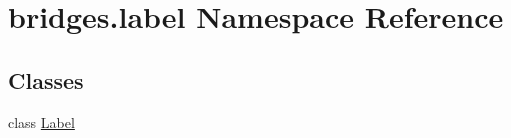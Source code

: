 \hypertarget{namespacebridges_1_1label}{}\section{bridges.\+label Namespace Reference}
\label{namespacebridges_1_1label}
\subsection*{Classes}
\begin{DoxyCompactItemize}
\item 
class \mbox{\hyperlink{classbridges_1_1label_1_1_label}{Label}}
\end{DoxyCompactItemize}
